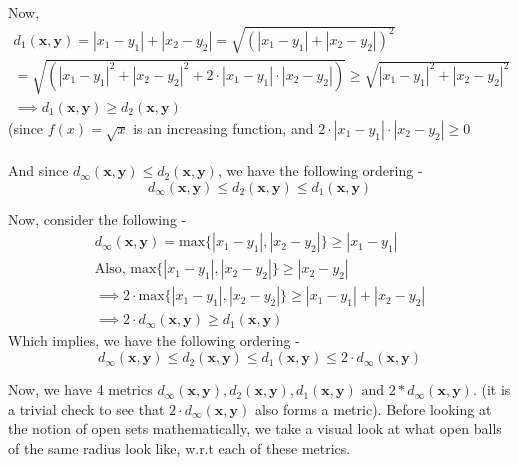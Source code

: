 \begin{frame}
    Now,
    \begin{gather*}
        d_1(\boldsymbol{x}, \boldsymbol{y}) = |x_1 - y_1| + |x_2 - y_2| = \sqrt{\left(|x_1 - y_1| + |x_2 - y_2|\right)^2} \\
        = \sqrt{\left(|x_1 - y_1|^2 + |x_2 - y_2|^2 + 2\cdot|x_1 - y_1|\cdot|x_2 - y_2|\right)} \geq \sqrt{|x_1 - y_1|^2 + |x_2 - y_2|^2} \\
        \implies d_1(\boldsymbol{x}, \boldsymbol{y}) \geq d_2(\boldsymbol{x}, \boldsymbol{y})
    \end{gather*}
    (since \( f(x) = \sqrt{x} \) is an increasing function, and \( 2\cdot|x_1 - y_1|\cdot|x_2 - y_2| \geq 0 \) \\\\
    \pause
    And since \(d_\infty(\boldsymbol{x}, \boldsymbol{y}) \leq d_2(\boldsymbol{x}, \boldsymbol{y})\), we have the following ordering -
    \begin{equation*}
        d_\infty(\boldsymbol{x}, \boldsymbol{y}) \leq d_2(\boldsymbol{x}, \boldsymbol{y}) \leq d_1(\boldsymbol{x}, \boldsymbol{y})
    \end{equation*}
\end{frame}

\begin{frame}
    Now, consider the following - 
    \begin{gather*}
        d_\infty(\boldsymbol{x}, \boldsymbol{y}) = \text{max} \{|x_1 - y_1|, |x_2 - y_2|\} \geq |x_1 - y_1| \\
        \text{Also, } \text{max} \{|x_1 - y_1|, |x_2 - y_2|\} \geq |x_2 - y_2| \\
        \implies 2 \cdot\text{max} \{|x_1 - y_1|, |x_2 - y_2|\} \geq |x_1 - y_1| + |x_2 - y_2| \\
        \implies 2 \cdot d_\infty(\boldsymbol{x}, \boldsymbol{y}) \geq d_1(\boldsymbol{x}, \boldsymbol{y})
    \end{gather*}
    Which implies, we have the following ordering -
    \begin{equation*}
        d_\infty(\boldsymbol{x}, \boldsymbol{y}) \leq d_2(\boldsymbol{x}, \boldsymbol{y}) \leq d_1(\boldsymbol{x}, \boldsymbol{y}) \leq 2 \cdot d_\infty(\boldsymbol{x}, \boldsymbol{y})
    \end{equation*}
\end{frame}

\begin{frame}
    Now, we have 4 metrics \( d_\infty(\boldsymbol{x}, \boldsymbol{y}), d_2(\boldsymbol{x}, \boldsymbol{y}), d_1(\boldsymbol{x}, \boldsymbol{y}) \text{ and } 2*d_\infty(\boldsymbol{x}, \boldsymbol{y})\). (it is a trivial check to see that $2 \cdot d_\infty(\boldsymbol{x}, \boldsymbol{y})$ also forms a metric). Before looking at the notion of open sets mathematically, we take a visual look at what open balls of the same radius look like, w.r.t each of these metrics. \\
    \pause
    \begin{figure}
        \hspace{8em}
        \scalebox{1.2}{}
    \end{figure}
\end{frame}

